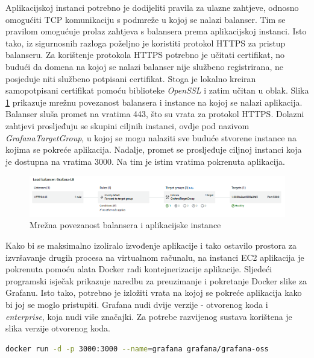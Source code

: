 Aplikacijskoj instanci potrebno je dodijeliti pravila za ulazne zahtjeve, odnosno omogućiti TCP komunikaciju s podmreže u kojoj se nalazi balanser. Tim se pravilom omogućuje prolaz zahtjeva s balansera prema aplikacijskoj instanci. Isto tako, iz sigurnosnih razloga poželjno je koristiti protokol HTTPS za pristup balanseru. Za korištenje protokola HTTPS potrebno je učitati certifikat, no budući da domena na kojoj se nalazi balanser nije službeno registrirana, ne posjeduje niti službeno potpisani certifikat. Stoga je lokalno kreiran samopotpisani certifikat pomoću biblioteke \textit{OpenSSL} i zatim učitan u oblak. Slika \ref{fig:load_balancer} prikazuje mrežnu povezanost balansera i instance na kojoj se nalazi aplikacija. Balanser sluša promet na vratima 443, što su vrata za protokol HTTPS. Dolazni zahtjevi prosljeđuju se skupini ciljnih instanci, ovdje pod nazivom \textit{GrafanaTargetGroup}, u kojoj se mogu nalaziti sve buduće stvorene instance na kojima se pokreće aplikacija. Nadalje, promet se prosljeđuje ciljnoj instanci koja je dostupna na vratima 3000. Na tim je istim vratima pokrenuta aplikacija. 

\begin{figure}[ht]
	\centering
	\includegraphics[scale=0.7]{imgs/load_balancer}
	\caption{Mrežna povezanost balansera i aplikacijske instance}
	\label{fig:load_balancer}
\end{figure}

Kako bi se maksimalno izoliralo izvođenje aplikacije i tako ostavilo prostora za izvršavanje drugih procesa na virtualnom računalu, na instanci EC2 aplikacija je pokrenuta pomoću alata Docker radi kontejnerizacije aplikacije. Sljedeći programski isječak prikazuje naredbu za preuzimanje i pokretanje Docker slike za Grafanu. Isto tako, potrebno je izložiti vrata na kojoj se pokreće aplikacija kako bi joj se moglo pristupiti. Grafana nudi dvije verzije - otvorenog koda i \textit{enterprise}, koja nudi više značajki. Za potrebe razvijenog sustava korištena je slika verzije otvorenog koda.

\begin{lstlisting}[caption={Pokretanje Docker slike za Grafanu}, language=bash]
	docker run -d -p 3000:3000 --name=grafana grafana/grafana-oss
\end{lstlisting}


